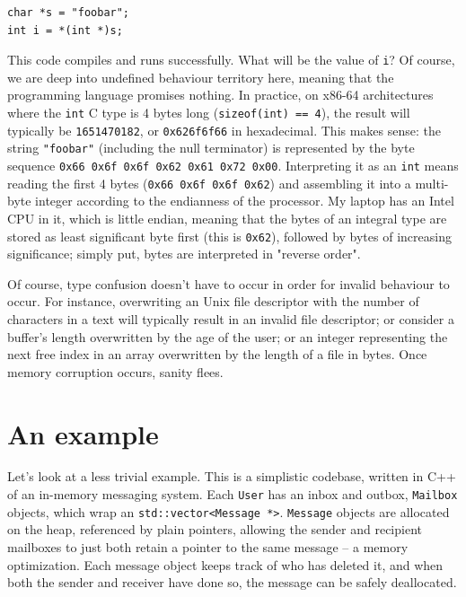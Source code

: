\begin{lstlisting}
char *s = "foobar";
int i = *(int *)s;
\end{lstlisting}

This code compiles and runs successfully. What will be the value of \lstinline!i!? Of course, we are deep into undefined behaviour territory here, meaning that the programming language promises nothing. In practice, on x86-64 architectures where the \lstinline!int! C type is 4 bytes long (\lstinline!sizeof(int) == 4!), the result will typically be \texttt{1651470182}, or \texttt{0x626f6f66} in hexadecimal. This makes sense: the string \lstinline!"foobar"! (including the null terminator) is represented by the byte sequence \texttt{0x66 0x6f 0x6f 0x62 0x61 0x72 0x00}. Interpreting it as an \lstinline!int! means reading the first 4 bytes (\texttt{0x66 0x6f 0x6f 0x62}) and assembling it into a multi-byte integer according to the endianness of the processor. My laptop has an Intel CPU in it, which is little endian, meaning that the bytes of an integral type are stored as least significant byte first (this is \texttt{0x62}), followed by bytes of increasing significance; simply put, bytes are interpreted in "reverse order".

Of course, type confusion doesn't have to occur in order for invalid behaviour to occur. For instance, overwriting an Unix file descriptor with the number of characters in a text will typically result in an invalid file descriptor; or consider a buffer's length overwritten by the age of the user; or an integer representing the next free index in an array overwritten by the length of a file in bytes. Once memory corruption occurs, sanity flees.

\section{An example}

Let's look at a less trivial example. This is a simplistic codebase, written in C++ of an in-memory messaging system. Each \lstinline!User! has an inbox and outbox, \lstinline!Mailbox! objects, which wrap an \lstinline!std::vector<Message *>!. \lstinline!Message! objects are allocated on the heap, referenced by plain pointers, allowing the sender and recipient mailboxes to just both retain a pointer to the same message -- a memory optimization. Each message object keeps track of who has deleted it, and when both the sender and receiver have done so, the message can be safely deallocated.

